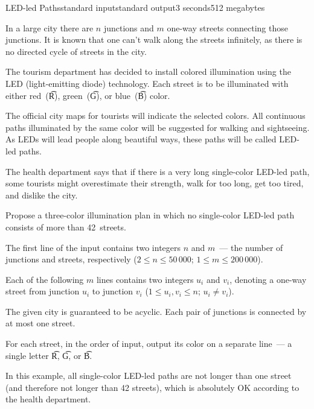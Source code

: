 \begin{problem}{LED-led Paths}{standard input}{standard output}{3 seconds}{512 megabytes}

In a large city there are $n$ junctions and $m$ one-way streets connecting those junctions. It is known that one can't walk along the streets infinitely, as there is no directed cycle of streets in the city.

The tourism department has decided to install colored illumination using the LED (light-emitting diode) technology. Each street is to be illuminated with either red~(\t{R}), green~(\t{G}), or blue~(\t{B}) color.

The official city maps for tourists will indicate the selected colors. All continuous paths illuminated by the same color will be suggested for walking and sightseeing. As LEDs will lead people along beautiful ways, these paths will be called LED-led paths.

The health department says that if there is a very long single-color LED-led path, some tourists might overestimate their strength, walk for too long, get too tired, and dislike the city.

Propose a three-color illumination plan in which no single-color LED-led path consists of more than 42~streets.

\InputFile
The first line of the input contains two integers $n$ and $m$~--- the number of junctions and streets, respectively ($2 \le n \le 50\,000$; $1 \le m \le 200\,000$).

Each of the following $m$ lines contains two integers $u_i$ and $v_i$, denoting a one-way street from junction $u_i$ to junction $v_i$ ($1 \le u_i, v_i \le n$; $u_i \neq v_i$).

The given city is guaranteed to be acyclic. Each pair of junctions is connected by at most one street.

\OutputFile
For each street, in the order of input, output its color on a separate line~--- a single letter \t{R}, \t{G}, or \t{B}.

\Example


\thelinewidth
{}\thelinewidth
{}\thelinewidth
\def\kwExampleNotes{Illustration}

\begin{examplethree}
%
\end{examplethree}

\Note
In this example, all single-color LED-led paths are not longer than one street (and therefore not longer than 42 streets), which is absolutely OK according to the health department.

\end{problem}

